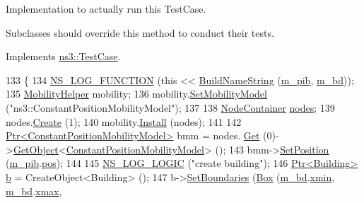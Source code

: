 Implementation to actually run this Test\+Case. 

Subclasses should override this method to conduct their tests. 

Implements \hyperlink{classns3_1_1TestCase_a8ff74680cf017ed42011e4be51917a24}{ns3\+::\+Test\+Case}.


\begin{DoxyCode}
133 \{
134   \hyperlink{log-macros-disabled_8h_a90b90d5bad1f39cb1b64923ea94c0761}{NS\_LOG\_FUNCTION} (\textcolor{keyword}{this} << \hyperlink{classBuildingsHelperOneTestCase_a915febbd85fa35818c0b00b3710c7a9c}{BuildNameString} (\hyperlink{classBuildingsHelperOneTestCase_aab8bca809365d6613287ffa50e946bb2}{m\_pib}, 
      \hyperlink{classBuildingsHelperOneTestCase_a4e5e58e9f67409bd4fe0a25e0ffda4bb}{m\_bd}));
135   \hyperlink{classns3_1_1MobilityHelper}{MobilityHelper} mobility;
136   mobility.\hyperlink{classns3_1_1MobilityHelper_a030275011b6f40682e70534d30280aba}{SetMobilityModel} (\textcolor{stringliteral}{"ns3::ConstantPositionMobilityModel"});
137 
138   \hyperlink{classns3_1_1NodeContainer}{NodeContainer} \hyperlink{visualizer-ideas_8txt_a3e1b3808014a2c68ab0cd0182e041be2}{nodes};
139   nodes.\hyperlink{classns3_1_1NodeContainer_a787f059e2813e8b951cc6914d11dfe69}{Create} (1);
140   mobility.\hyperlink{classns3_1_1MobilityHelper_a07737960ee95c0777109cf2994dd97ae}{Install} (nodes);
141   
142   \hyperlink{classns3_1_1Ptr}{Ptr<ConstantPositionMobilityModel>} bmm = nodes.
      \hyperlink{classns3_1_1NodeContainer_a9ed96e2ecc22e0f5a3d4842eb9bf90bf}{Get} (0)->\hyperlink{classns3_1_1Object_a13e18c00017096c8381eb651d5bd0783}{GetObject}<\hyperlink{classns3_1_1ConstantPositionMobilityModel}{ConstantPositionMobilityModel}> ();
143   bmm->\hyperlink{classns3_1_1MobilityModel_ac584b3d5a309709d2f13ed6ada1e7640}{SetPosition} (\hyperlink{classBuildingsHelperOneTestCase_aab8bca809365d6613287ffa50e946bb2}{m\_pib}.\hyperlink{structPositionInBuilding_a41887f00f92dbe21cdede9467303a82c}{pos});
144 
145   \hyperlink{group__logging_ga88acd260151caf2db9c0fc84997f45ce}{NS\_LOG\_LOGIC} (\textcolor{stringliteral}{"create building"});
146   \hyperlink{classns3_1_1Ptr}{Ptr<Building>} \hyperlink{buildings__pathloss_8m_a21ad0bd836b90d08f4cf640b4c298e7c}{b} = CreateObject<Building> ();
147   b->\hyperlink{classns3_1_1Building_a4b69659f05a983f06e33e7db62415915}{SetBoundaries} (\hyperlink{classns3_1_1Box}{Box} (\hyperlink{classBuildingsHelperOneTestCase_a4e5e58e9f67409bd4fe0a25e0ffda4bb}{m\_bd}.\hyperlink{structBuildingData_a2041c5468f8b7179754b8b88c42183f7}{xmin}, \hyperlink{classBuildingsHelperOneTestCase_a4e5e58e9f67409bd4fe0a25e0ffda4bb}{m\_bd}.\hyperlink{structBuildingData_afa169d4c63bffda0cf1565ea8d850d37}{xmax}, 

\end{DoxyCode}
